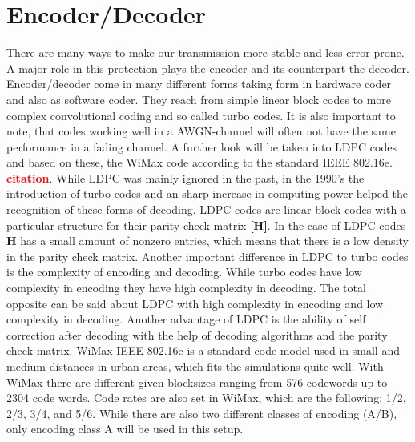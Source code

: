 \documentclass[12pt,oneside, reqno]{report}
\newcommand\boldred[1]{\textcolor{red}{\textbf{#1}}}
\begin{document}
\section{Encoder/Decoder}
\label{sec:code}
There are many ways to make our transmission more stable and less error prone. A major role in this protection plays the encoder and its counterpart the decoder. Encoder/decoder come in many different forms taking form in hardware coder and also as software coder. They reach from simple linear block codes to more complex convolutional coding and so called turbo codes. It is also important to note, that codes working well in a AWGN-channel will often not have the same performance in a fading channel. A further look will be taken into \gls{LDPC} codes and based on these, the WiMax code according to the standard IEEE 802.16e. \boldred{citation}. While \gls{LDPC} was mainly ignored in the past, in the 1990's the introduction of turbo codes and an sharp increase in computing power helped the recognition of these forms of decoding.
\newline
\gls{LDPC}-codes are linear block codes with a particular structure for their parity check matrix \textbf{[H]}. In the case of \gls{LDPC}-codes \textbf{H} has a small amount of nonzero entries, which means that there is a low density in the parity check matrix.
Another important difference in LDPC to turbo codes is the complexity of encoding and decoding. While turbo codes have low complexity in encoding they have high complexity in decoding. The total opposite can be said about \gls{LDPC} with high complexity in encoding and low complexity in decoding. Another advantage of \gls{LDPC} is the ability of self correction after decoding with the help of decoding algorithms and the parity check matrix.  
\newline
WiMax IEEE 802.16e is a standard code model used in small and medium distances in urban areas, which fits the simulations quite well. With WiMax there are different given blocksizes ranging from 576 codewords up to 2304 code words. Code rates are also set in WiMax, which are the following: 1/2, 2/3, 3/4, and 5/6. While there are also two different classes of encoding (A/B), only encoding class A will be used in this setup.
\newpage
\end{document}
